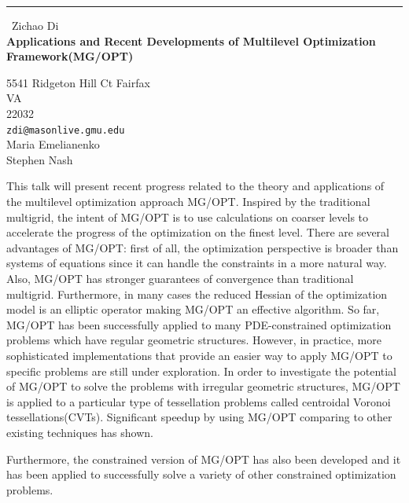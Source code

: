 \documentclass{report}
\begin{document}
\begin{center}
\rule{6in}{1pt} \
{\large Zichao Di \\
{\bf Applications and Recent Developments of Multilevel Optimization Framework(MG/OPT)}}

5541 Ridgeton Hill Ct Fairfax \\ VA \\ 22032
\\
{\tt zdi@masonlive.gmu.edu}\\
Maria Emelianenko\\
Stephen Nash\end{center}

This talk will present recent progress related to the theory and
applications of the multilevel optimization approach MG/OPT. Inspired by
the traditional multigrid, the intent of MG/OPT is to use calculations on
coarser levels to accelerate the progress of the optimization on the
finest level. There are several advantages of MG/OPT: first of all, the
optimization perspective is broader than systems of equations since it
can handle the constraints in a more natural way. Also, MG/OPT has
stronger guarantees of convergence than traditional multigrid.
Furthermore, in many cases the reduced Hessian of the optimization model
is an elliptic operator making MG/OPT an effective algorithm.
So far, MG/OPT has been successfully applied to many PDE-constrained
optimization problems which have regular geometric structures. However,
in practice, more sophisticated implementations that provide an easier
way to apply MG/OPT to specific problems are still under exploration.
In order to investigate the potential of MG/OPT to solve the problems
with irregular geometric structures, MG/OPT is applied to a particular
type of tessellation problems called centroidal Voronoi
tessellations(CVTs). Significant speedup by using MG/OPT comparing to
other existing techniques has shown.

Furthermore, the constrained version of MG/OPT has also been developed
and it has been applied to successfully solve a variety of other
constrained optimization problems.
\end{document}
